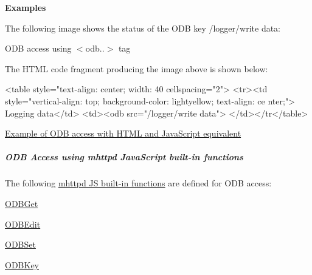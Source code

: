 \label{RC_mhttpd_custom_ODB_access_odb_tag_ex1}
\hypertarget{RC_mhttpd_custom_ODB_access_odb_tag_ex1}{}
 {\bfseries Examples} 
\begin{DoxyEnumerate}
\item The following image shows the status of the ODB key /logger/write data:\par
 \begin{center} ODB access using $<$odb..$>$ tag \par
  \end{center} 

The HTML code fragment producing the image above is shown below:


\begin{DoxyCode}
<table style="text-align: center; width: 40%
cellspacing="2">
<tr><td style="vertical-align: top; background-color: lightyellow; text-align: ce
      nter;">
Logging data</td>
<td><odb src="/logger/write data">
</td></tr</table>
\end{DoxyCode}



\item \hyperlink{RC_mhttpd_custom_ODB_access_examples_RC_mhttpd_js_example1}{Example of ODB access with HTML and JavaScript equivalent} 
\end{DoxyEnumerate}\par


\par
\hypertarget{RC_mhttpd_custom_ODB_access_RC_mhttpd_custom_odb_js}{}\subparagraph{ODB Access using mhttpd JavaScript built-\/in functions}\label{RC_mhttpd_custom_ODB_access_RC_mhttpd_custom_odb_js}
The following \hyperlink{RC_mhttpd_custom_js_lib}{mhttpd JS built-\/in functions} are defined for ODB access:
\begin{DoxyItemize}
\item \hyperlink{RC_mhttpd_custom_ODB_access_RC_mhttpd_custom_odbget}{ODBGet}
\item \hyperlink{RC_mhttpd_custom_ODB_access_RC_mhttpd_custom_odbedit}{ODBEdit}
\item \hyperlink{RC_mhttpd_custom_ODB_access_RC_mhttpd_custom_odbset}{ODBSet}
\item \hyperlink{RC_mhttpd_custom_ODB_access_RC_mhttpd_custom_odbkey}{ODBKey}
\end{DoxyItemize}

